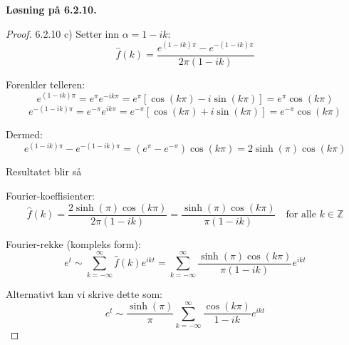 \documentclass[a4paper,norsk]{article}
\newenvironment{oppgave}[1]%
	{\trivlist{}\item\relax\textbf{Løsning på #1.}\medspace}%
	{\endtrivlist}
\begin{document}
\begin{oppgave}{6.2.10}
\begin{proof}{6.2.10 c)}
Setter inn $\alpha = 1 - ik$:
\[
\hat{f}(k) = \frac{e^{(1 - ik)\pi} - e^{-(1 - ik)\pi}}{2\pi (1 - ik)}
\]

Forenkler telleren:
\[
e^{(1 - ik)\pi} = e^{\pi} e^{-ik\pi} = e^{\pi} [\cos(k\pi) - i\sin(k\pi)] = e^{\pi} \cos(k\pi)
\]
\[
e^{-(1 - ik)\pi} = e^{-\pi} e^{ik\pi} = e^{-\pi} [\cos(k\pi) + i\sin(k\pi)] = e^{-\pi} \cos(k\pi)
\]

Dermed:
\[
e^{(1 - ik)\pi} - e^{-(1 - ik)\pi} = (e^{\pi} - e^{-\pi}) \cos(k\pi) = 2\sinh(\pi) \cos(k\pi)
\]

Resultatet blir så

Fourier-koeffisienter:
\[
\hat{f}(k) = \frac{2\sinh(\pi) \cos(k\pi)}{2\pi (1 - ik)}
= \frac{\sinh(\pi) \cos(k\pi)}{\pi (1 - ik)}
\quad \text{for alle } k \in \mathbb{Z}
\]

Fourier-rekke (kompleks form):
\[
e^t \sim \sum_{k=-\infty}^{\infty} \hat{f}(k)e^{ikt} 
= \sum_{k=-\infty}^{\infty} \frac{\sinh(\pi) \cos(k\pi)}{\pi (1 - ik)} e^{ikt}
\]

Alternativt kan vi skrive dette som:
\[
e^t \sim \frac{\sinh(\pi)}{\pi} \sum_{k=-\infty}^{\infty} \frac{\cos(k\pi)}{1 - ik} e^{ikt}
\]


\end{proof}
\end{oppgave}
\end{document}
